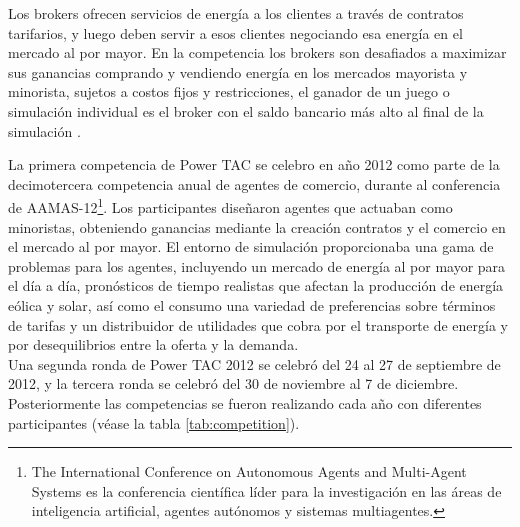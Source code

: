 Los brokers ofrecen servicios de energía a los clientes a través de contratos tarifarios, y luego deben servir a esos clientes negociando esa energía en el mercado al por mayor. En la competencia los brokers son desafiados a maximizar sus ganancias comprando y vendiendo energía en los mercados mayorista y minorista, sujetos a costos fijos y restricciones, el ganador de un juego o simulación individual es el broker con el saldo bancario más alto al final de la simulación \cite{WKetterJCollinsyMdWeerdtThe2017PowerTAC}.

La primera competencia de Power TAC se celebro en año 2012 como parte de la decimotercera competencia anual de agentes de comercio, durante al conferencia de AAMAS-12\footnote{The International Conference on Autonomous Agents and Multi-Agent Systems es la conferencia científica líder para la investigación en las áreas de inteligencia artificial, agentes autónomos y sistemas multiagentes.}. 
Los participantes diseñaron agentes  que actuaban como minoristas, obteniendo ganancias mediante la creación contratos y el comercio en el mercado al por mayor. 
El entorno  de simulación proporcionaba una gama de problemas para los agentes, incluyendo un mercado de energía al por mayor para el día a día, pronósticos de tiempo realistas que afectan la producción de energía eólica y solar, así como el consumo una variedad de preferencias sobre términos de tarifas y un distribuidor de utilidades que cobra por el transporte de energía y por desequilibrios entre la oferta y la demanda.\\

Una segunda ronda de Power TAC 2012 se celebró del 24 al 27 de septiembre de 2012, y la tercera ronda se celebró del 30 de noviembre al 7 de diciembre. Posteriormente las competencias se fueron realizando cada año con diferentes participantes (véase la tabla \ref{tab:competition}).

